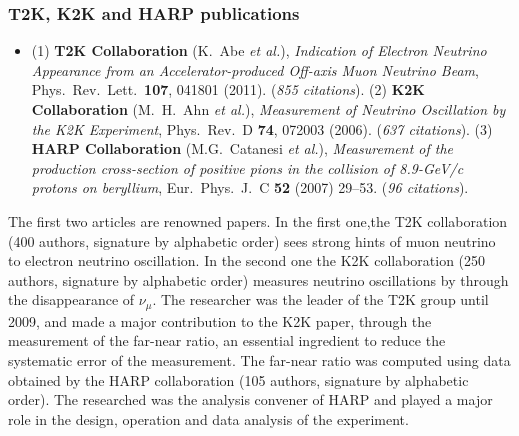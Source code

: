 
\subsubsection*{T2K, K2K and HARP publications}
\begin{itemize}
\item (1) {\bf T2K Collaboration} (K.~Abe {\it et al.}), {\it Indication of Electron Neutrino Appearance from an Accelerator-produced Off-axis Muon Neutrino Beam}, Phys.\ Rev.\ Lett.\  {\bf 107}, 041801 (2011). ({\it 855 citations}). (2) {\bf K2K Collaboration} (M.~H.~Ahn {\it et al.}), {\it Measurement of Neutrino Oscillation by the K2K Experiment}, Phys.\ Rev.\ D {\bf 74}, 072003 (2006). ({\it 637 citations}). (3) {\bf HARP Collaboration} (M.G.~Catanesi \textit{et al.}), \textit{Measurement of the production cross-section of positive pions in the collision of 8.9-GeV/c protons on beryllium}, Eur.\ Phys.\ J.\ C {\bf52} (2007) 29--53. ({\it 96 citations}).
\end{itemize}
The first two articles are renowned papers. In the first one,the T2K collaboration (400 authors, signature by alphabetic order) sees strong hints of muon neutrino to electron neutrino oscillation. In the second one the K2K collaboration (250 authors, signature by alphabetic order) measures neutrino oscillations by through the disappearance of $\nu_\mu$. The researcher was the leader of the T2K group until 2009, and made a major contribution to the K2K paper, through the measurement of the far-near ratio, an essential ingredient to reduce the systematic error of the measurement. The far-near ratio was computed using data obtained by the HARP collaboration (105 authors, signature by alphabetic order). The researched was the analysis convener of HARP and played a major role in the design, operation and data analysis of the experiment.
 	
